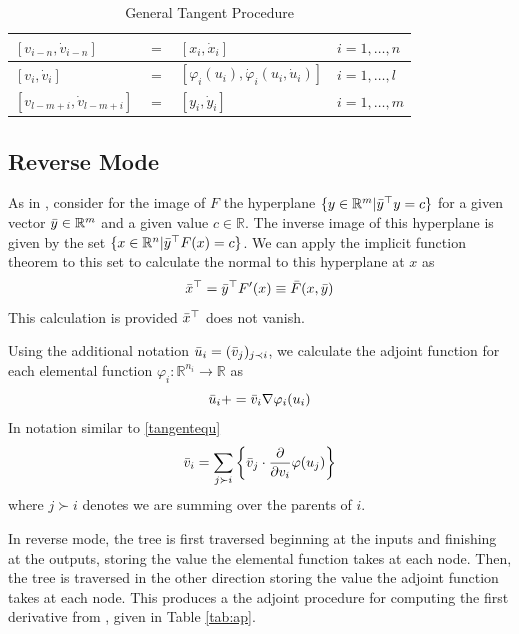 \documentclass{article}
\begin{document}
\begin{table}[h]
    \centering
    \begin{tabular}{|lcll|}
        \hline
        $[v_{i-n}, \Dot{v}_{i-n}]$ & $=$ & $[x_{i}, \Dot{x}_{i}]$ & $i = 1, \ldots, n$ \\
        \hline
        $[v_{i}, \Dot{v}_{i}]$ & $=$ & $[\varphi_i (u_i), \Dot{\varphi}_i(u_i, \Dot{u}_i)]$ & $i = 1, \ldots, l$ \\
        \hline
        $[v_{l-m+i}, \Dot{v}_{l-m+i}]$ & $=$ & $[y_{i}, \Dot{y}_{i}]$ & $i = 1, \ldots, m$ \\
        \hline
    \end{tabular}
    \caption{General Tangent Procedure}
    \label{tab:gtp}
\end{table}

\subsection{Reverse Mode}

As in \cite{dhamarticle}, consider for the image of $F$ the hyperplane $\{ y \in \mathbb{R}^m | \Bar{y}^\top y = c\}$ for a given vector $\Bar{y} \in \mathbb{R}^m$ and a given value $c \in \mathbb{R}$. The inverse image of this hyperplane is given by the set $\{ x \in \mathbb{R}^n | \Bar{y}^\top F(x) = c\}$. We can apply the implicit function theorem to this set to calculate the normal to this hyperplane at $x$ as
\begin{equation}
    \Bar{x}^\top = \Bar{y}^\top F'(x) \equiv \Bar{F}(x, \Bar{y})
\end{equation}
This calculation is provided $\Bar{x}^\top$ does not vanish.

Using the additional notation $\Bar{u}_i = (\Bar{v}_j)_{j \prec i}$, we calculate the adjoint function for each elemental function $\varphi_i : \mathbb{R}^{n_i} \longrightarrow \mathbb{R}$ as
\begin{equation}
    \Bar{u}_i += \Bar{v}_i \nabla \varphi_i (u_i)
\end{equation}
In notation similar to \eqref{tangentequ}
\begin{equation}
    \Bar{v}_i = \sum_{j \succ i} \left\{ \Bar{v}_j \cdot \frac{\partial}{\partial v_i} \varphi(u_j) \right\}
\end{equation}
where $j \succ i$ denotes we are summing over the parents of $i$.

In reverse mode, the tree is first traversed beginning at the inputs and finishing at the outputs, storing the value the elemental function takes at each node. Then, the tree is traversed in the other direction storing the value the adjoint function takes at each node. This produces a the adjoint procedure for computing the first derivative from \cite{dhamarticle}, given in Table \ref{tab:ap}.
\end{document}
